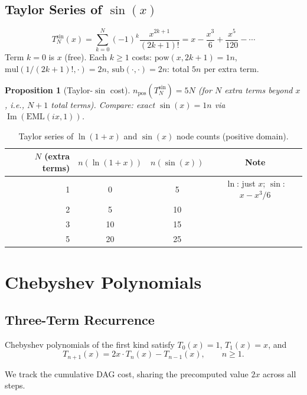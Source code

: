 \documentclass[11pt,a4paper]{article}
\newtheorem{proposition}[theorem]{Proposition}
\begin{document}
\subsection{Taylor Series of $\sin(x)$}

\[
  T_N^{\sin}(x) = \sum_{k=0}^{N} (-1)^k \frac{x^{2k+1}}{(2k+1)!}
                = x - \frac{x^3}{6} + \frac{x^5}{120} - \cdots
\]
Term $k=0$ is $x$ (free). Each $k \geq 1$ costs:
$\mathrm{pow}(x, 2k+1) = 1n$, $\mathrm{mul}(1/(2k+1)!, \cdot) = 2n$,
$\mathrm{sub}(\cdot, \cdot) = 2n$: total $5n$ per extra term.

\begin{proposition}[Taylor-$\sin$ cost]
  $n_\mathrm{pos}(T_N^{\sin}) = 5N$ (for $N$ extra terms beyond $x$, i.e., $N+1$ total terms).
  Compare: exact $\sin(x) = 1n$ via $\operatorname{Im}(\mathrm{EML}(ix, 1))$.
\end{proposition}

\begin{table}[h]
\centering
\caption{Taylor series of $\ln(1+x)$ and $\sin(x)$ node counts (positive domain).}
\label{tab:taylor_lnsin}
\begin{tabular}{rccc}
\toprule
$N$ (extra terms) & $n(\ln(1+x))$ & $n(\sin(x))$ & Note \\
\midrule
1 & 0 & 5  & $\ln$: just $x$; $\sin$: $x - x^3/6$ \\
2 & 5 & 10 & \\
3 & 10 & 15 & \\
5 & 20 & 25 & \\
\bottomrule
\end{tabular}
\end{table}

\section{Chebyshev Polynomials}

\subsection{Three-Term Recurrence}

Chebyshev polynomials of the first kind satisfy $T_0(x) = 1$, $T_1(x) = x$, and
\[
  T_{n+1}(x) = 2x \cdot T_n(x) - T_{n-1}(x), \qquad n \geq 1.
\]

We track the cumulative DAG cost, sharing the precomputed value $2x$ across all steps.
\end{document}
